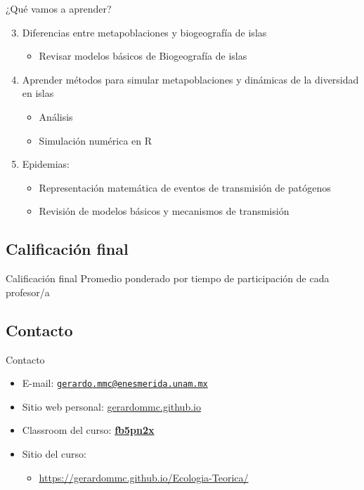 \documentclass[
  11pt,
  ignorenonframetext,
]{beamer}
\providecommand{\tightlist}{%
  \setlength{\itemsep}{0pt}\setlength{\parskip}{0pt}}
\begin{document}
\begin{frame}{¿Qué vamos a aprender?}
\begin{enumerate}
\setcounter{enumi}{2}
\item
  Diferencias entre metapoblaciones y biogeografía de islas

  \begin{itemize}
  \tightlist
  \item
    Revisar modelos básicos de Biogeografía de islas
  \end{itemize}
\item
  Aprender métodos para simular metapoblaciones y dinámicas de la
  diversidad en islas

  \begin{itemize}
  \item
    Análisis
  \item
    Simulación numérica en R
  \end{itemize}
\item
  Epidemias:

  \begin{itemize}
  \item
    Representación matemática de eventos de transmisión de patógenos
  \item
    Revisión de modelos básicos y mecanismos de transmisión
  \end{itemize}
\end{enumerate}
\end{frame}

\subsection{Calificación final}\label{calificaciuxf3n-final}

\begin{frame}{Calificación final}
Promedio ponderado por tiempo de participación de cada profesor/a
\end{frame}

\subsection{Contacto}\label{contacto}

\begin{frame}{Contacto}
\begin{itemize}
\item
  E-mail:
  \href{mailto:gerardo.mmc@enesmerida.unam.mx}{\nolinkurl{gerardo.mmc@enesmerida.unam.mx}}
\item
  Sitio web personal:
  \href{https://gerardommc.github.com}{gerardommc.github.io}
\item
  Classroom del curso:
  \href{https://classroom.google.com/c/NjE3NDQ4Njg5NDgz?cjc=fb5pn2x}{\textbf{fb5pn2x}}
\item
  Sitio del curso:

  \begin{itemize}
  \tightlist
  \item
    \url{https://gerardommc.github.io/Ecologia-Teorica/}
  \end{itemize}
\end{itemize}
\end{frame}
\end{document}
